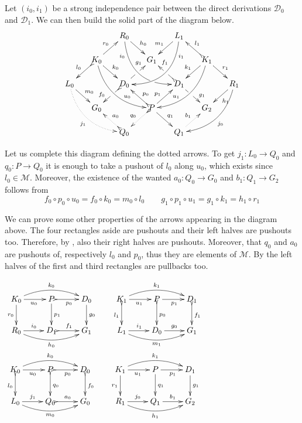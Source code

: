 \documentclass[a4paper,UKenglish,cleveref,pdftex,thm-restate,numberwithinsect,anonymous]{lipics}
\newcommand{\dder}[1]{\mathscr{#1}}
\begin{document}
\begin{remark}\label{rem:deco} 
	Let $(i_0, i_1)$ be a strong
	independence pair between the direct derivations $\dder{D}_0$ and
	$\dder{D}_1$. We can then build the solid part of the diagram
	below.
	\[\xymatrix@C=15pt@R=15pt{&&R_0 \ar@/_.8cm/[ddrr]_(.2){i_0}|(.7)\hole
		\ar[dr]^{h_0}&& L_1\ar@/^.8cm/[ddll]^(.2){i_1}
		\ar[dl]_{m_1}\\&K_0\ar[dr]^{k_0}\ar@{>->}[dl]_{l_0}
		\ar@/_.6cm/[ddrr]^(.65){u_0}\ar[ur]^{r_0}&& G_1 && K_1
		\ar@/^.6cm/[ddll]_(.65){u_1}\ar[dl]_{k_1}\ar@{>->}[lu]_{l_1}
		\ar[dr]^{r_1}\\L_0 \ar[dr]^{m_0}
		\ar@{.>}@/_.6cm/[ddrr]_{j_1}&& D_0
		\ar@{>->}[dl]|(.42)\hole_(.64){f_0}\ar[ur]|(.48)\hole^(.7){g_1}&&D_1
		\ar[dr]|(.42)\hole^(.65){g_1}
		\ar@{>->}[ul]|(.48)\hole_(.7){f_1}&&R_1\ar@/^.6cm/[ddll]^{j_0}\ar[dl]^{h_1}\\&G_0
		&&P\ar[dr]^{q_1}
		\ar@{>.>}[dl]_{q_0}\ar[ur]^(.4){p_1}\ar@{>->}[ul]_(.4){p_0}&&G_2\\&&Q_0
		\ar@{>->}@{>.>}[ul]_{a_0} &&Q_1\ar@{.>}[ur]^{b_1}}
	\]
	
	Let us complete this diagram defining the dotted arrows. To get
	$j_1\colon L_0\to Q_0$ and $q_0\colon P\to Q_0$ it is enough to
	take a pushout of $l_0$ along $u_0$, which exists since
	$l_0\in \mathcal{M}$. Moreover, the existence of the wanted
	$a_0\colon Q_0\to G_0$ and $b_1\colon Q_1\to G_2$ follows from
	\[
	f_0\circ p_0 \circ u_0 = f_0\circ k_0 = m_0\circ l_0 \qquad
	g_1\circ p_1\circ u_1 = g_1\circ k_1=h_1\circ r_1
	\]
	
	\noindent
	\parbox{5.5cm}{\hspace{15pt}We can prove some other properties of
		the arrows appearing in the diagram above. The four rectangles
		aside are pushouts and their left halves are pushouts
		too. Therefore, by , also their right halves are
		pushouts.  Moreover, that $q_0$ and $a_0$ are pushouts of,
		respectively $l_0$ and $p_0$, thus they are elements of
		$\mathcal{M}$. By  the left halves of the
		first and third rectangles are pullbacks too.}  \parbox{3.5cm}{
		$\xymatrix{K_0 \ar@/^.4cm/[rr]^{k_0}\ar[d]_{r_0}\ar[r]_{u_0}
			&P\ar[d]^{p_1} \ar@{>->}[r]_{p_0} & D_0 \ar[d]^{g_0}&K_1
			\ar@/^.4cm/[rr]^{k_1}\ar@{>->}[d]_{l_1}\ar[r]_{u_1}
			&P\ar@{>->}[d]^{p_0} \ar[r]_{p_1} & D_1 \ar@{>->}[d]^{f_1}\\
			R_0 \ar@/_.4cm/[rr]_{h_0} \ar[r]^{i_0}&D_1 \ar@{>->}[r]^{f_1}
			& G_1&L_1 \ar@/_.4cm/[rr]_{m_1} \ar[r]^{i_1}&D_0\ar[r]^{g_0} &
			G_1}$
		$\xymatrix{K_0
			\ar@/^.4cm/[rr]^{k_0}\ar@{>->}[d]_{l_0}\ar[r]_{u_0}
			&P\ar@{>->}[d]^{q_0} \ar@{>->}[r]_{p_0} & D_0
			\ar@{>->}[d]^{f_0}&K_1
			\ar@/^.4cm/[rr]^{k_1}\ar[d]_{r_1}\ar[r]_{u_1}
			&P\ar[d]^{q_1} \ar[r]_{p_1} & D_1 \ar[d]^{g_1}\\
			L_0 \ar@/_.4cm/[rr]_{m_0} \ar[r]^{j_1}&Q_0 \ar@{>->}[r]^{a_0}
			& G_0&R_1 \ar@/_.4cm/[rr]_{h_1} \ar[r]^{j_0}&Q_1 \ar[r]^{b_1}
			& G_2}$}
\end{remark}
\end{document}
